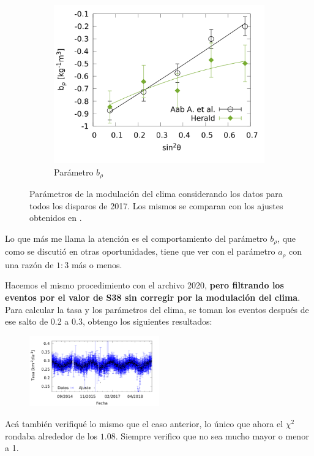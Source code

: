 \begin{figure}[H]
					\begin{subfigure}[b]{\textwidth}
					\centering
					\includegraphics[width=0.5\linewidth]{../Anisotropia/params/brho_2017_above_1EeV.png}
					\caption{Parámetro  $b_\rho$	 }
					\label{fig:brho_2017_1EeV}
					\end{subfigure}%
					\caption{Parámetros de la modulación del clima considerando los datos para todos los disparos de 2017. Los mismos se comparan con los ajustes obtenidos en \cite{aab2017impact}.}\label{fig:parameters_2017_1EeV}
				\end{figure}

				Lo que más me llama la atención es el comportamiento del parámetro $b_\rho$, que como se discutió en otras oportunidades, tiene que ver con el parámetro $a_\rho$ con una razón de  $1:3$ más o menos. 



			Hacemos el mismo procedimiento con el archivo 2020, {\bf pero filtrando los eventos por el valor de S38 sin corregir por la modulación del clima}. Para calcular la tasa y los parámetros del clima, se toman los eventos después de ese salto de 0.2 a 0.3, obtengo los siguientes resultados:

				\begin{figure}[H]
					\centering
					\includegraphics[width=0.5\textwidth]{../Anisotropia/daily_rate/daily_rate_AllTriggers_2020_1EeV.png}
				\end{figure}

			Acá también verifiqué lo mismo que el caso anterior, lo único que ahora el $\chi^2$ rondaba alrededor de los $1.08$. Siempre verifico que no sea mucho mayor o menor a 1.

